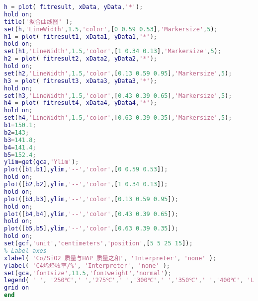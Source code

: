 \documentclass[withoutpreface,bwprint]{cumcmthesis} %
\begin{document}
\begin{appendices}
\begin{lstlisting}[language=matlab]
%显示数据
h = plot( fitresult, xData, yData,'*');
hold on;
title('拟合曲线图' );
set(h,'LineWidth',1.5,'color',[0 0.59 0.53],'Markersize',5);
h1 = plot( fitresult1, xData1, yData1,'*');
hold on;
set(h1,'LineWidth',1.5,'color',[1 0.34 0.13],'Markersize',5);
h2 = plot( fitresult2, xData2, yData2,'*');
hold on;
set(h2,'LineWidth',1.5,'color',[0.13 0.59 0.95],'Markersize',5);
h3 = plot( fitresult3, xData3, yData3,'*');
hold on;
set(h3,'LineWidth',1.5,'color',[0.43 0.39 0.65],'Markersize',5);
h4 = plot( fitresult4, xData4, yData4,'*');
hold on;
set(h4,'LineWidth',1.5,'color',[0.63 0.39 0.35],'Markersize',5);
b1=150.1;
b2=143;
b3=141.8;
b4=141.4;
b5=152.4;
ylim=get(gca,'Ylim');
plot([b1,b1],ylim,'--','color',[0 0.59 0.53]); 
hold on;
plot([b2,b2],ylim,'--','color',[1 0.34 0.13]); 
hold on;
plot([b3,b3],ylim,'--','color',[0.13 0.59 0.95]); 
hold on;
plot([b4,b4],ylim,'--','color',[0.43 0.39 0.65]); 
hold on;
plot([b5,b5],ylim,'--','color',[0.63 0.39 0.35]); 
hold on;
set(gcf,'unit','centimeters','position',[5 5 25 15]);
% Label axes
xlabel( 'Co/SiO2 质量与HAP 质量之和', 'Interpreter', 'none' );
ylabel( 'C4烯烃收率/%', 'Interpreter', 'none' );
set(gca,'fontsize',11.5,'fontweight','normal');
legend( ' ', '250℃',' ','275℃',' ','300℃',' ','350℃',' ','400℃', 'Location', 'NorthWest', 'Interpreter', 'none' );
grid on
end	
\end{lstlisting}
\end{appendices}
\end{document}
